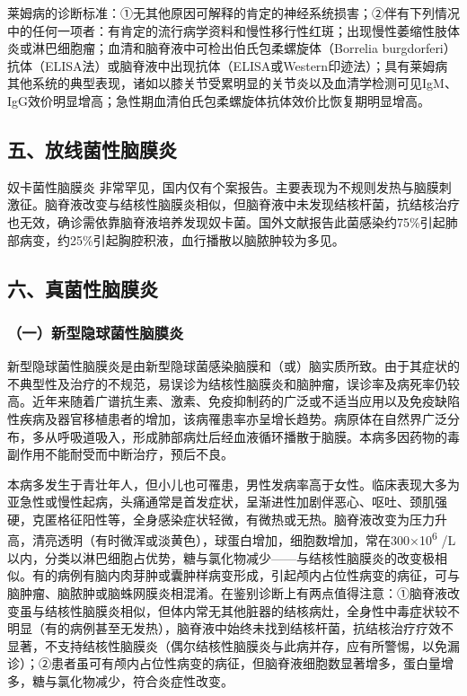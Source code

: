 莱姆病的诊断标准：①无其他原因可解释的肯定的神经系统损害；②伴有下列情况中的任何一项者：有肯定的流行病学资料和慢性移行性红斑；出现慢性萎缩性肢体炎或淋巴细胞瘤；血清和脑脊液中可检出伯氏包柔螺旋体（Borrelia
burgdorferi）抗体（ELISA法）或脑脊液中出现抗体（ELISA或Western印迹法）；具有莱姆病其他系统的典型表现，诸如以膝关节受累明显的关节炎以及血清学检测可见IgM、IgG效价明显增高；急性期血清伯氏包柔螺旋体抗体效价比恢复期明显增高。

\protect\hypertarget{text00388.html}{}{}

\subsection{五、放线菌性脑膜炎}

奴卡菌性脑膜炎
非常罕见，国内仅有个案报告。主要表现为不规则发热与脑膜刺激征。脑脊液改变与结核性脑膜炎相似，但脑脊液中未发现结核杆菌，抗结核治疗也无效，确诊需依靠脑脊液培养发现奴卡菌。国外文献报告此菌感染约75\%引起肺部病变，约25\%引起胸腔积液，血行播散以脑脓肿较为多见。

\protect\hypertarget{text00389.html}{}{}

\subsection{六、真菌性脑膜炎}

\subsubsection{（一）新型隐球菌性脑膜炎}

新型隐球菌性脑膜炎是由新型隐球菌感染脑膜和（或）脑实质所致。由于其症状的不典型性及治疗的不规范，易误诊为结核性脑膜炎和脑肿瘤，误诊率及病死率仍较高。近年来随着广谱抗生素、激素、免疫抑制药的广泛或不适当应用以及免疫缺陷性疾病及器官移植患者的增加，该病罹患率亦呈增长趋势。病原体在自然界广泛分布，多从呼吸道吸入，形成肺部病灶后经血液循环播散于脑膜。本病多因药物的毒副作用不能耐受而中断治疗，预后不良。

本病多发生于青壮年人，但小儿也可罹患，男性发病率高于女性。临床表现大多为亚急性或慢性起病，头痛通常是首发症状，呈渐进性加剧伴恶心、呕吐、颈肌强硬，克匿格征阳性等，全身感染症状轻微，有微热或无热。脑脊液改变为压力升高，清亮透明（有时微浑或淡黄色），球蛋白增加，细胞数增加，常在300×10\textsuperscript{6}
/L以内，分类以淋巴细胞占优势，糖与氯化物减少------与结核性脑膜炎的改变极相似。有的病例有脑内肉芽肿或囊肿样病变形成，引起颅内占位性病变的病征，可与脑肿瘤、脑脓肿或脑蛛网膜炎相混淆。在鉴别诊断上有两点值得注意：①脑脊液改变虽与结核性脑膜炎相似，但体内常无其他脏器的结核病灶，全身性中毒症状较不明显（有的病例甚至无发热），脑脊液中始终未找到结核杆菌，抗结核治疗疗效不显著，不支持结核性脑膜炎（偶尔结核性脑膜炎与此病并存，应有所警惕，以免漏诊）；②患者虽可有颅内占位性病变的病征，但脑脊液细胞数显著增多，蛋白量增多，糖与氯化物减少，符合炎症性改变。

